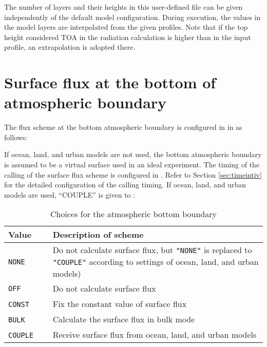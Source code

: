 The number of layers and their heights in this user-defined file can be given independently of the default model configuration. During execution, the values in the model layers are interpolated from the given profiles. Note that if the top height considered TOA in the radiation calculation is higher than in the input profile, an extrapolation is adopted there.



\section{Surface flux at the bottom of atmospheric boundary } \label{sec:basic_usel_surface}
The flux scheme at the bottom atmospheric boundary is configured in  in  as follows:

If ocean, land, and urban models are not used, the bottom atmospheric boundary is assumed to be a virtual surface used in an ideal experiment. The timing of the calling of the surface flux scheme is configured in . Refer to Section \ref{sec:timeintiv} for the detailed configuration of the calling timing. If ocean, land, and urban models are used, ``COUPLE'' is given to :

\begin{table}[htb]
\begin{center}
  \caption{Choices for the atmospheric bottom boundary }
  \label{tab:nml_atm_sf}
  \begin{tabularx}{150mm}{lX} \hline
    \rowcolor[gray]{0.9}  Value & Description of scheme\\ \hline
      \verb|NONE|         & Do not calculate surface flux, but \verb|"NONE"| is replaced to \verb|"COUPLE"| according to settings of ocean, land, and urban models) \\
      \verb|OFF|          & Do not calculate surface flux\\
      \verb|CONST|   　　　& Fix the constant value of surface flux \\
      \verb|BULK|    　　　& Calculate the surface flux in bulk mode \\
      \verb|COUPLE|  　　　& Receive surface flux from ocean, land, and urban models \\
    \hline
  \end{tabularx}
\end{center}
\end{table}

